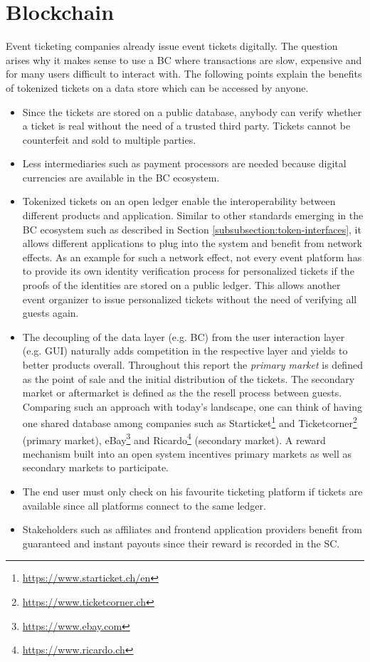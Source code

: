 \section{Blockchain}


Event ticketing companies already issue event tickets digitally. The question arises why it makes sense to use a BC where transactions are slow, expensive and for many users difficult to interact with. The following points explain the benefits of tokenized tickets on a data store which can be accessed by anyone. 

\begin{itemize}
	\item Since the tickets are stored on a public database, anybody can verify whether a ticket is real without the need of a trusted third party. Tickets cannot be counterfeit and sold to multiple parties. 
	\item Less intermediaries such as payment processors are needed because digital currencies are available in the BC ecosystem. 
	\item Tokenized tickets on an open ledger enable the interoperability between different products and application. Similar to other standards emerging in the BC ecosystem such as described in Section \ref{subsubsection:token-interfaces}, it allows different applications to plug into the system and benefit from network effects. As an example for such a network effect, not every event platform has to provide its own identity verification process for personalized tickets if the proofs of the identities are stored on a public ledger. This allows another event organizer to issue personalized tickets without the need of verifying all guests again.
	\item The decoupling of the data layer (e.g. BC) from the user interaction layer (e.g. GUI) naturally adds competition in the respective layer and yields to better products overall. Throughout this report the \textit{primary market} is defined as the point of sale and the initial distribution of the tickets. The secondary market or aftermarket is defined as the the resell process between guests. Comparing such an approach with today's landscape, one can think of having one shared database among companies such as Starticket\footnote{\href{https://www.starticket.ch/en}{https://www.starticket.ch/en}} and Ticketcorner\footnote{\href{https://www.ticketcorner.ch}{https://www.ticketcorner.ch}} (primary market), eBay\footnote{\href{https://www.ebay.com}{https://www.ebay.com}} and Ricardo\footnote{\href{https://www.ricardo.ch}{https://www.ricardo.ch}} (secondary market). A reward mechanism built into an open system incentives primary markets as well as secondary markets to participate. 
	\item The end user must only check on his favourite ticketing platform if tickets are available since all platforms connect to the same ledger.
	\item Stakeholders such as affiliates and frontend application providers benefit from guaranteed and instant payouts since their reward is recorded in the SC. 
\end{itemize}
